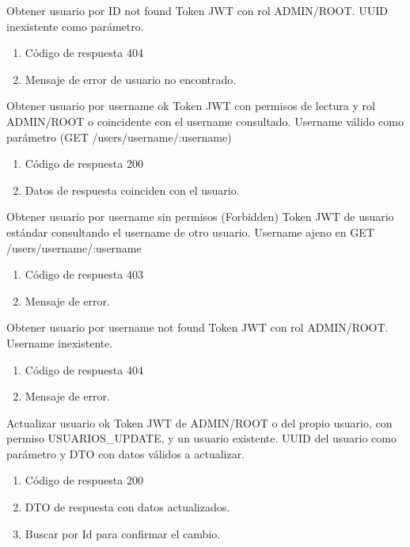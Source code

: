 {Obtener usuario por ID not found}
{Token JWT con rol ADMIN/ROOT.}
{UUID inexistente como parámetro.}
{\begin{enumerate} [leftmargin=*, nosep]
    \item Código de respuesta 404
    \item Mensaje de error de usuario no encontrado.
\end{enumerate}}

{Obtener usuario por username ok}
{Token JWT con permisos de lectura y rol ADMIN/ROOT o coincidente con el username consultado.}
{Username válido como parámetro (GET /users/username/:username)}
{\begin{enumerate} [leftmargin=*, nosep]
    \item Código de respuesta 200
    \item Datos de respuesta coinciden con el usuario.
\end{enumerate}}

{Obtener usuario por username sin permisos (Forbidden)}
{Token JWT de usuario estándar consultando el username de otro usuario.}
{Username ajeno en GET /users/username/:username}
{\begin{enumerate} [leftmargin=*, nosep]
    \item Código de respuesta 403
    \item Mensaje de error.
\end{enumerate}}

{Obtener usuario por username not found}
{Token JWT con rol ADMIN/ROOT.}
{Username inexistente.}
{\begin{enumerate} [leftmargin=*, nosep]
    \item Código de respuesta 404
    \item Mensaje de error.
\end{enumerate}}

{Actualizar usuario ok}
{Token JWT de ADMIN/ROOT o del propio usuario, con permiso USUARIOS\_UPDATE, y un usuario existente.}
{UUID del usuario como parámetro y DTO con datos válidos a actualizar.}
{\begin{enumerate} [leftmargin=*, nosep]
    \item Código de respuesta 200
    \item DTO de respuesta con datos actualizados.
    \item Buscar por Id para confirmar el cambio.
\end{enumerate}}

